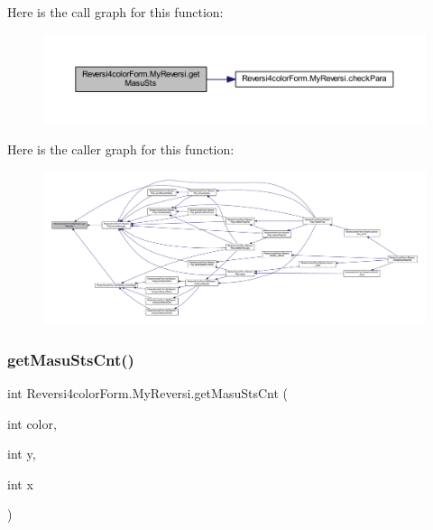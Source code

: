 Here is the call graph for this function\+:
\nopagebreak
\begin{figure}[H]
\begin{center}
\leavevmode
\includegraphics[width=350pt]{class_reversi4color_form_1_1_my_reversi_adc564d9d8aa75a871d33e09373485530_cgraph}
\end{center}
\end{figure}
Here is the caller graph for this function\+:
\nopagebreak
\begin{figure}[H]
\begin{center}
\leavevmode
\includegraphics[width=350pt]{class_reversi4color_form_1_1_my_reversi_adc564d9d8aa75a871d33e09373485530_icgraph}
\end{center}
\end{figure}
\mbox{\label{class_reversi4color_form_1_1_my_reversi_a5380e8f78bafedf7b0cdc86d943c8c22}} 
\subsubsection{\texorpdfstring{get\+Masu\+Sts\+Cnt()}{getMasuStsCnt()}}
{\footnotesize\ttfamily int Reversi4color\+Form.\+My\+Reversi.\+get\+Masu\+Sts\+Cnt (\begin{DoxyParamCaption}\item[{int}]{color,  }\item[{int}]{y,  }\item[{int}]{x }\end{DoxyParamCaption})}



